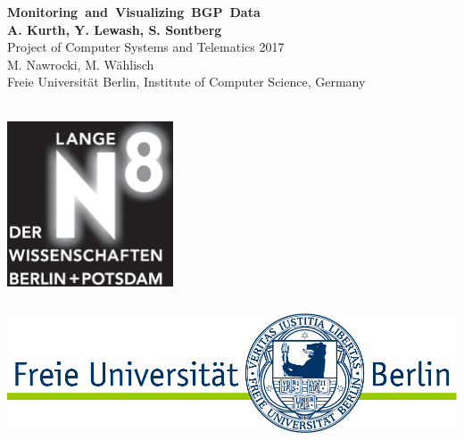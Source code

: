 \documentclass[a0,portrait,posterdraft]{a0poster}
\begin{document}


\begin{minipage}[b]{0.667\linewidth}
\VeryHuge \textbf{Monitoring~and~Visualizing~BGP~Data} \\[.6cm]
\huge \textbf{{A. Kurth, Y. Lewash, S. Sontberg}}\\[2.4cm] %
\Huge Project of Computer Systems and Telematics 2017\\[0.5cm] %
\huge M. Nawrocki, M. W\"ahlisch\\[0.5cm] %
\huge Freie Universit\"at Berlin, Institute of Computer Science, Germany\\[0.4cm] %
\tiny \\
\end{minipage}
%
\begin{minipage}[b]{0.333\linewidth}

{\includegraphics[height=4.9cm,interpolate]{LN_Logo.eps}}
\hspace{1cm}
{\includegraphics[height=4.9cm,interpolate]{FULogo-RGB.pdf}}\\[2cm]
    \vspace{1.5cm}
\end{minipage}
\end{document}
